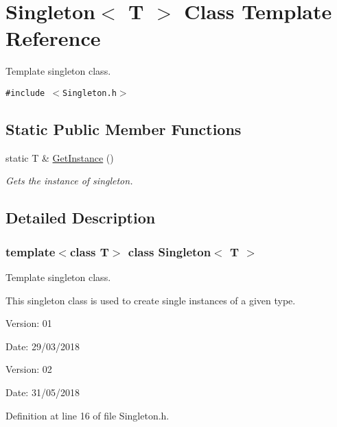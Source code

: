 \hypertarget{class_singleton}{
\section{Singleton$<$ T $>$ Class Template Reference}
\label{class_singleton}
}
Template singleton class.  


{\tt \#include $<$Singleton.h$>$}

\subsection*{Static Public Member Functions}
\begin{CompactItemize}
\item 
static T \& \hyperlink{class_singleton_db2c49abf86f1ada00d6811f30edd9e6}{GetInstance} ()
\begin{CompactList}\small\item\em Gets the instance of singleton. \item\end{CompactList}\end{CompactItemize}


\subsection{Detailed Description}
\subsubsection*{template$<$class T$>$ class Singleton$<$ T $>$}

Template singleton class. 

This singleton class is used to create single instances of a given type.

\begin{Desc}
\item[Version:]01 \end{Desc}
\begin{Desc}
\item[Date:]29/03/2018\end{Desc}
\begin{Desc}
\item[Version:]02 \end{Desc}
\begin{Desc}
\item[Date:]31/05/2018 \end{Desc}


Definition at line 16 of file Singleton.h.

